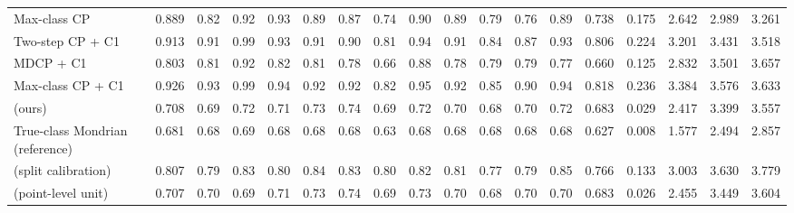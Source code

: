 \begin{table}[!htbp]
{\begin{tabular}{lccccccccccccccccc}
Max-class CP & 0.889 & 0.82 & 0.92 & 0.93 & 0.89 & 0.87 & 0.74 & 0.90 & 0.89 & 0.79 & 0.76 & 0.89 & 0.738 & 0.175 & 2.642 & 2.989 & 3.261 \\
Two-step CP + C1 & 0.913 & 0.91 & 0.99 & 0.93 & 0.91 & 0.90 & 0.81 & 0.94 & 0.91 & 0.84 & 0.87 & 0.93 & 0.806 & 0.224 & 3.201 & 3.431 & 3.518 \\
MDCP + C1 & 0.803 & 0.81 & 0.92 & 0.82 & 0.81 & 0.78 & 0.66 & 0.88 & 0.78 & 0.79 & 0.79 & 0.77 & 0.660 & 0.125 & 2.832 & 3.501 & 3.657 \\
Max-class CP + C1 & 0.926 & 0.93 & 0.99 & 0.94 & 0.92 & 0.92 & 0.82 & 0.95 & 0.92 & 0.85 & 0.90 & 0.94 & 0.818 & 0.236 & 3.384 & 3.576 & 3.633 \\
\gamut{} (ours) & 0.708 & 0.69 & 0.72 & 0.71 & 0.73 & 0.74 & 0.69 & 0.72 & 0.70 & 0.68 & 0.70 & 0.72 & 0.683 & 0.029 & 2.417 & 3.399 & 3.557 \\
True-class Mondrian (reference) & 0.681 & 0.68 & 0.69 & 0.68 & 0.68 & 0.68 & 0.63 & 0.68 & 0.68 & 0.68 & 0.68 & 0.68 & 0.627 & 0.008 & 1.577 & 2.494 & 2.857 \\
\gamut{} (split calibration) & 0.807 & 0.79 & 0.83 & 0.80 & 0.84 & 0.83 & 0.80 & 0.82 & 0.81 & 0.77 & 0.79 & 0.85 & 0.766 & 0.133 & 3.003 & 3.630 & 3.779 \\
\gamut{} (point-level unit) & 0.707 & 0.70 & 0.69 & 0.71 & 0.73 & 0.74 & 0.69 & 0.73 & 0.70 & 0.68 & 0.70 & 0.70 & 0.683 & 0.026 & 2.455 & 3.449 & 3.604 \\
\bottomrule
\end{tabular}}
\end{table}

